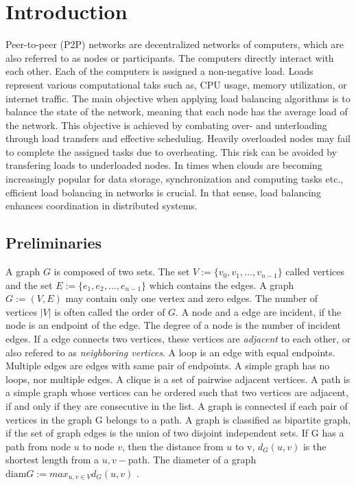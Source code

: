 \chapter{Introduction}\label{chap:introduction}
Peer-to-peer (P2P) networks are decentralized networks of computers, which are also referred to as nodes or participants. The computers directly interact with each other. Each of the computers is assigned a non-negative load. Loads represent various computational taks such as, CPU usage, memory utilization, or internet traffic. The main objective when applying load balancing algorithms is to balance the state of the network, meaning that each node has the average load of the network. This objective is achieved by combating over- and unterloading through load transfers and effective scheduling. Heavily overloaded nodes may fail to complete the assigned tasks due to overheating. This risk can be avoided by transfering loads to underloaded nodes. In times when clouds are becoming increasingly popular for data storage, synchronization and computing  tasks etc., efficient load bolancing in networks is crucial. In that sense, load balancing enhances coordination in distributed systems.

\section{Preliminaries}\label{sec:prelimn}
A graph $G$ is composed of two sets. The set $V := \{v_0, v_1,..., v_{n-1}\}$ called vertices and the set $E := \{e_1, e_2,...,e_{n-1}\}$ which contains the edges. A graph $G := (V, E)$ may contain only one vertex and zero edges. The number of vertices $|V|$ is often called the order of $G$. A node and a edge are incident, if the node is an endpoint of the edge. The degree of a node is the number of incident edges. If a edge connects two vertices, these vertices are \textit{adjacent} to each other, or also refered to as \textit{neighboring vertices}. A loop is an edge with equal endpoints. Multiple edges are edges with same pair of endpoints. A simple graph has no loops, nor multiple edges. A clique is a set of pairwise adjacent vertices. A path is a simple graph whose vertices can be ordered such that two vertices are adjacent, if and only if they are consecutive in the list. A graph is connected if each pair of vertices in the graph G belongs to a path. A graph is classified as bipartite graph, if the set of graph edges is the union of two disjoint independent sets. If G has a path from node $u$ to node $v$, then the distance from $u$ to v, $d_G(u,v)$ is the shortest length from a $u,v-$path. The diameter of a graph $\text{diam} G := max_{u,v\in V}d_G(u,v)$ \cite{GraphTheorySchindelhaauer2021}. 

